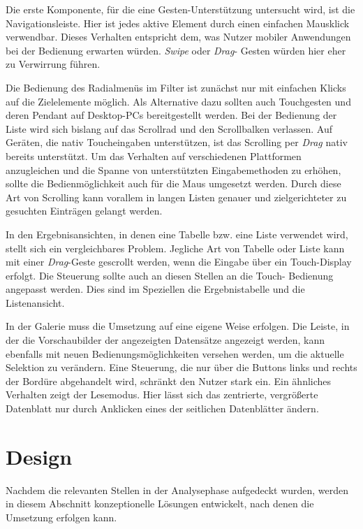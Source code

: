 Die erste Komponente, für die eine Gesten-Unterstützung untersucht wird, ist die Navigationsleiste. Hier ist jedes aktive Element durch einen einfachen Mausklick verwendbar. Dieses Verhalten entspricht dem, was Nutzer mobiler Anwendungen bei der Bedienung erwarten würden. \textit{Swipe} oder \textit{Drag}- Gesten würden hier eher zu Verwirrung führen.\par
Die Bedienung des Radialmenüs im Filter ist zunächst nur mit einfachen Klicks auf die Zielelemente möglich. Als Alternative dazu sollten auch Touchgesten und deren Pendant auf Desktop-PCs bereitgestellt werden. Bei der Bedienung der Liste wird sich bislang auf das Scrollrad und den Scrollbalken verlassen. Auf Geräten, die nativ Toucheingaben unterstützen, ist das Scrolling per \textit{Drag} nativ bereits unterstützt. Um das Verhalten auf verschiedenen Plattformen anzugleichen und die Spanne von unterstützten Eingabemethoden zu erhöhen, sollte die Bedienmöglichkeit auch für die Maus umgesetzt werden. Durch diese Art von Scrolling kann vorallem in langen Listen genauer und zielgerichteter zu gesuchten Einträgen gelangt werden.\par %
In den Ergebnisansichten, in denen eine Tabelle bzw. eine Liste verwendet wird, stellt sich ein vergleichbares Problem. Jegliche Art von Tabelle oder Liste kann mit einer \textit{Drag}-Geste gescrollt werden, wenn die Eingabe über ein Touch-Display erfolgt. Die Steuerung sollte auch an diesen Stellen an die Touch- Bedienung angepasst werden. Dies sind im Speziellen die Ergebnistabelle und die Listenansicht.\par
In der Galerie muss die Umsetzung auf eine eigene Weise erfolgen. Die Leiste, in der die Vorschaubilder der angezeigten Datensätze angezeigt werden, kann ebenfalls mit neuen Bedienungsmöglichkeiten versehen werden, um die aktuelle Selektion zu verändern. Eine Steuerung, die nur über die Buttons links und rechts der Bordüre abgehandelt wird, schränkt den Nutzer stark ein. Ein ähnliches Verhalten zeigt der Lesemodus. Hier lässt sich das zentrierte, vergrößerte Datenblatt nur durch Anklicken eines der seitlichen Datenblätter ändern.\par
\section{Design} \label{sec:designInteraction}
Nachdem die relevanten Stellen in der Analysephase aufgedeckt wurden, werden in diesem Abschnitt konzeptionelle Lösungen entwickelt, nach denen die Umsetzung erfolgen kann.\par

